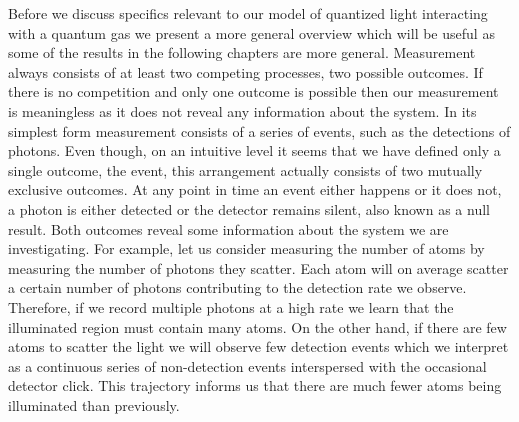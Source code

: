Before we discuss specifics relevant to our model of quantized light
interacting with a quantum gas we present a more general overview
which will be useful as some of the results in the following chapters
are more general. Measurement always consists of at least two
competing processes, two possible outcomes. If there is no competition
and only one outcome is possible then our measurement is meaningless
as it does not reveal any information about the system. In its
simplest form measurement consists of a series of events, such as the
detections of photons. Even though, on an intuitive level it seems
that we have defined only a single outcome, the event, this
arrangement actually consists of two mutually exclusive outcomes. At
any point in time an event either happens or it does not, a photon is
either detected or the detector remains silent, also known as a null
result. Both outcomes reveal some information about the system we are
investigating. For example, let us consider measuring the number of
atoms by measuring the number of photons they scatter. Each atom will
on average scatter a certain number of photons contributing to the
detection rate we observe. Therefore, if we record multiple photons at
a high rate we learn that the illuminated region must contain many
atoms. On the other hand, if there are few atoms to scatter the light
we will observe few detection events which we interpret as a
continuous series of non-detection events interspersed with the
occasional detector click. This trajectory informs us that there are
much fewer atoms being illuminated than previously.

